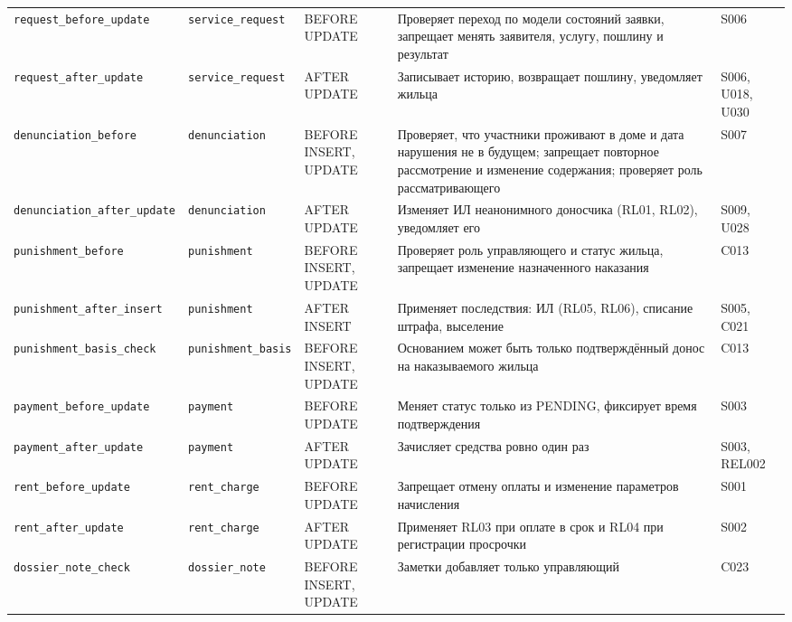 \documentclass[12pt,a4paper]{article}
\begin{document}
\begin{longtable}{L{33.3mm} L{30.5mm} L{20.4mm} L{48.1mm} L{15.7mm}}
\texttt{request\_\allowbreak{}before\_\allowbreak{}update} & \texttt{service\_\allowbreak{}request} & BEFORE UPDATE & Проверяет переход по модели состояний заявки, запрещает менять заявителя, услугу, пошлину и результат & S006 \\
\texttt{request\_\allowbreak{}after\_\allowbreak{}update} & \texttt{service\_\allowbreak{}request} & AFTER UPDATE & Записывает историю, возвращает пошлину, уведомляет жильца & S006, U018, U030 \\
\texttt{denunciation\_\allowbreak{}before} & \texttt{denunciation} & BEFORE INSERT, UPDATE & Проверяет, что участники проживают в доме и дата нарушения не в будущем; запрещает повторное рассмотрение и изменение содержания; проверяет роль рассматривающего & S007 \\
\texttt{denunciation\_\allowbreak{}after\_\allowbreak{}update} & \texttt{denunciation} & AFTER UPDATE & Изменяет ИЛ неанонимного доносчика (RL01, RL02), уведомляет его & S009, U028 \\
\texttt{punishment\_\allowbreak{}before} & \texttt{punishment} & BEFORE INSERT, UPDATE & Проверяет роль управляющего и статус жильца, запрещает изменение назначенного наказания & C013 \\
\texttt{punishment\_\allowbreak{}after\_\allowbreak{}insert} & \texttt{punishment} & AFTER INSERT & Применяет последствия: ИЛ (RL05, RL06), списание штрафа, выселение & S005, C021 \\
\texttt{punishment\_\allowbreak{}basis\_\allowbreak{}check} & \texttt{punishment\_\allowbreak{}basis} & BEFORE INSERT, UPDATE & Основанием может быть только подтверждённый донос на наказываемого жильца & C013 \\
\texttt{payment\_\allowbreak{}before\_\allowbreak{}update} & \texttt{payment} & BEFORE UPDATE & Меняет статус только из PENDING, фиксирует время подтверждения & S003 \\
\texttt{payment\_\allowbreak{}after\_\allowbreak{}update} & \texttt{payment} & AFTER UPDATE & Зачисляет средства ровно один раз & S003, REL002 \\
\texttt{rent\_\allowbreak{}before\_\allowbreak{}update} & \texttt{rent\_\allowbreak{}charge} & BEFORE UPDATE & Запрещает отмену оплаты и изменение параметров начисления & S001 \\
\texttt{rent\_\allowbreak{}after\_\allowbreak{}update} & \texttt{rent\_\allowbreak{}charge} & AFTER UPDATE & Применяет RL03 при оплате в срок и RL04 при регистрации просрочки & S002 \\
\texttt{dossier\_\allowbreak{}note\_\allowbreak{}check} & \texttt{dossier\_\allowbreak{}note} & BEFORE INSERT, UPDATE & Заметки добавляет только управляющий & C023 \\
\end{longtable}
\end{document}
